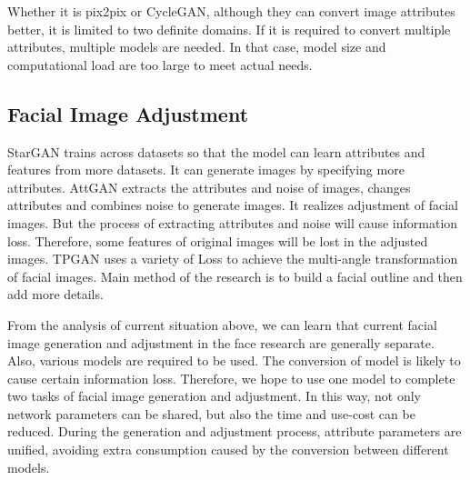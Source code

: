Whether it is pix2pix or CycleGAN,
    although they can convert image attributes better,
    it is limited to two definite domains.
If it is required to convert multiple attributes, multiple models are needed.
In that case, model size and computational load are too large to meet actual needs.

\subsection{Facial Image Adjustment}
StarGAN trains across datasets so that the model can learn attributes and features from more datasets.
It can generate images by specifying more attributes.
AttGAN extracts the attributes and noise of images,
    changes attributes and combines noise to generate images.
It realizes adjustment of facial images.
But the process of extracting attributes and noise will cause information loss.
Therefore, some features of original images will be lost in the adjusted images.
TPGAN uses a variety of Loss to achieve the multi-angle transformation of facial images.
Main method of the research is to build a facial outline and then add more details.



\vspace{3ex}

From the analysis of current situation above,
    we can learn that current facial image generation and adjustment in the face research are generally separate.
Also, various models are required to be used.
The conversion of model is likely to cause certain information loss.
Therefore, we hope to use one model to complete two tasks of facial image generation and adjustment.
In this way, not only network parameters can be shared,
    but also the time and use-cost can be reduced.
During the generation and adjustment process, attribute parameters are unified,
    avoiding extra consumption caused by the conversion between different models.